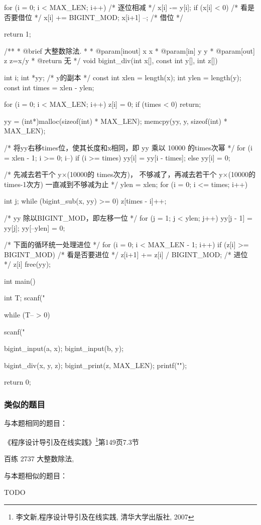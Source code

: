 \begin{Codex}[label=bigint_div.c]
{    for (i = 0; i < MAX_LEN; i++) {  /* 逐位相减 */
        x[i] -= y[i];
        if (x[i] < 0) {  /* 看是否要借位 */
            x[i] += BIGINT_MOD;
            x[i+1] --;  /* 借位 */
        }
    }

    return 1;
}

/**
 * @brief 大整数除法.
 *
 * @param[inout] x x
 * @param[in] y y
 * @param[out] z z=x/y
 * @return 无
 */
void bigint_div(int x[], const int y[], int z[]) {
    int i;
    int *yy; /* y的副本 */
    const int xlen = length(x);
    int ylen = length(y);
    const int times = xlen - ylen;

    for (i = 0; i < MAX_LEN; i++) z[i] = 0;
    if (times < 0) return;

    yy = (int*)malloc(sizeof(int) * MAX_LEN);
    memcpy(yy, y, sizeof(int) * MAX_LEN);


    /* 将yy右移times位，使其长度和x相同，即 yy 乘以 10000 的times次幂 */
    for (i = xlen - 1; i >= 0; i--) {
        if (i >= times) yy[i] = yy[i - times];
        else yy[i] = 0;
    }

    /* 先减去若干个 y×(10000的 times次方)， 
      不够减了，再减去若干个 y×(10000的 times-1次方)
      一直减到不够减为止 */
    ylen = xlen;
    for (i = 0; i <= times; i++) {
        int j;
        while (bigint_sub(x, yy) >= 0) {
            z[times - i]++;
        }

        /* yy 除以BIGINT_MOD，即左移一位 */
        for (j = 1; j < ylen; j++) {
            yy[j - 1] = yy[j];
        }
        yy[--ylen] = 0;
    }

    /* 下面的循环统一处理进位 */
    for (i = 0; i < MAX_LEN - 1; i++) {
        if (z[i] >= BIGINT_MOD) {  /* 看是否要进位 */
            z[i+1] += z[i] / BIGINT_MOD;  /* 进位 */
            z[i] %
        }
    }
    free(yy);
}

int main() {
    int T;    
    scanf("%

    while (T-- > 0) {
        scanf("%

        bigint_input(a, x);
        bigint_input(b, y);

        bigint_div(x, y, z);
        bigint_print(z, MAX_LEN);
        printf("\n"); 
    }
    return 0;
}
\end{Codex}

\subsubsection{类似的题目}
与本题相同的题目：
\begindot
\item 《程序设计导引及在线实践》\footnote{李文新,程序设计导引及在线实践, 清华大学出版社, 2007}第149页7.3节
\item 百练 2737 大整数除法, 
\myenddot

与本题相似的题目：
\begindot
\item  TODO
\myenddot
